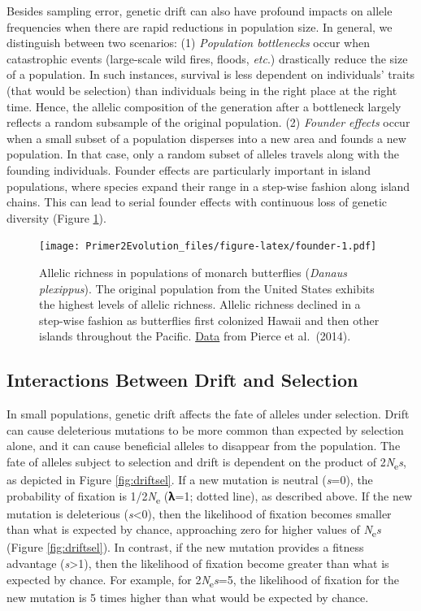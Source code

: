 \documentclass[
]{book}
\begin{document}
Besides sampling error, genetic drift can also have profound impacts on allele frequencies when there are rapid reductions in population size. In general, we distinguish between two scenarios: (1) \emph{Population bottlenecks} occur when catastrophic events (large-scale wild fires, floods, \emph{etc}.) drastically reduce the size of a population. In such instances, survival is less dependent on individuals' traits (that would be selection) than individuals being in the right place at the right time. Hence, the allelic composition of the generation after a bottleneck largely reflects a random subsample of the original population. (2) \emph{Founder effects} occur when a small subset of a population disperses into a new area and founds a new population. In that case, only a random subset of alleles travels along with the founding individuals. Founder effects are particularly important in island populations, where species expand their range in a step-wise fashion along island chains. This can lead to serial founder effects with continuous loss of genetic diversity (Figure \ref{fig:founder}).

\begin{figure}
\centering
\texttt{[image: Primer2Evolution\_files/figure-latex/founder-1.pdf]}
\caption{\label{fig:founder}Allelic richness in populations of monarch butterflies (\emph{Danaus plexippus}). The original population from the United States exhibits the highest levels of allelic richness. Allelic richness declined in a step-wise fashion as butterflies first colonized Hawaii and then other islands throughout the Pacific. \href{data/6_serial_founder.csv}{Data} from Pierce et al.~(2014).}
\end{figure}

\hypertarget{interactions-between-drift-and-selection}{%
\subsection{Interactions Between Drift and Selection}\label{interactions-between-drift-and-selection}}

In small populations, genetic drift affects the fate of alleles under selection. Drift can cause deleterious mutations to be more common than expected by selection alone, and it can cause beneficial alleles to disappear from the population. The fate of alleles subject to selection and drift is dependent on the product of 2\emph{N}\textsubscript{e}\emph{s}, as depicted in Figure \ref{fig:driftsel}. If a new mutation is neutral (\emph{s}=0), the probability of fixation is 1/2\emph{N}\textsubscript{e} (𝛌=1; dotted line), as described above. If the new mutation is deleterious (\emph{s}\textless0), then the likelihood of fixation becomes smaller than what is expected by chance, approaching zero for higher values of \emph{N}\textsubscript{e}\emph{s}\textbar{} (Figure \ref{fig:driftsel}). In contrast, if the new mutation provides a fitness advantage (\emph{s}\textgreater1), then the likelihood of fixation become greater than what is expected by chance. For example, for 2\emph{N}\textsubscript{e}\emph{s}=5, the likelihood of fixation for the new mutation is 5 times higher than what would be expected by chance.
\end{document}
